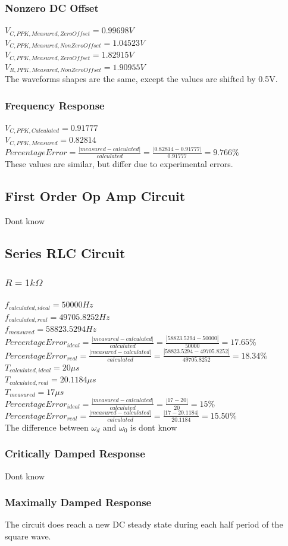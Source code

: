 \documentclass[10pt]{article}
\begin{document}
\subsubsection*{Nonzero DC Offset}
$V_{C,PPK,Measured,ZeroOffset} = 0.99698V$\\
$V_{C,PPK,Measured,NonZeroOffset} = 1.04523V$\\
$V_{C,PPK,Measured,ZeroOffset} = 1.82915V$\\
$V_{R,PPK,Measured,NonZeroOffset} = 1.90955V$\\
\noindent The waveforms shapes are the same, except the values are shifted by 0.5V.

\subsubsection*{Frequency Response}
$V_{C,PPK,Calculated} = 0.91777$\\
$V_{C,PPK,Measured} = 0.82814$\\
$Percentage Error = \frac{|measured-calculated|}{calculated} = \frac{|0.82814-0.91777|}{0.91777} = 9.766\%$\\
\noindent These values are similar, but differ due to experimental errors.

\subsection*{First Order Op Amp Circuit}
Dont know

\subsection*{Series RLC Circuit}
\subsubsection*{$R = 1k\Omega$}
$f_{calculated,ideal} = 50000 Hz$\\
$f_{calculated,real} = 49705.8252 Hz$\\
$f_{measured} = 58823.5294 Hz$\\
$Percentage Error_{ideal} = \frac{|measured-calculated|}{calculated} = \frac{|58823.5294-50000|}{50000} = 17.65\%$\\
$Percentage Error_{real} = \frac{|measured-calculated|}{calculated} = \frac{|58823.5294-49705.8252|}{49705.8252} = 18.34\%$\\
$T_{calculated,ideal} = 20\mu s$\\
$T_{calculated,real} = 20.1184\mu s$\\
$T_{measured} = 17\mu s$\\
$Percentage Error_{ideal} = \frac{|measured-calculated|}{calculated} = \frac{|17-20|}{20} = 15\%$\\
$Percentage Error_{real} = \frac{|measured-calculated|}{calculated} = \frac{|17-20.1184|}{20.1184} = 15.50\%$\\
\noindent The difference between $\omega_d$ and $\omega_0$ is dont know

\subsubsection*{Critically Damped Response}
Dont know

\subsubsection*{Maximally Damped Response}
\noindent The circuit does reach a new DC steady state during each half period of the square wave.
\end{document}
